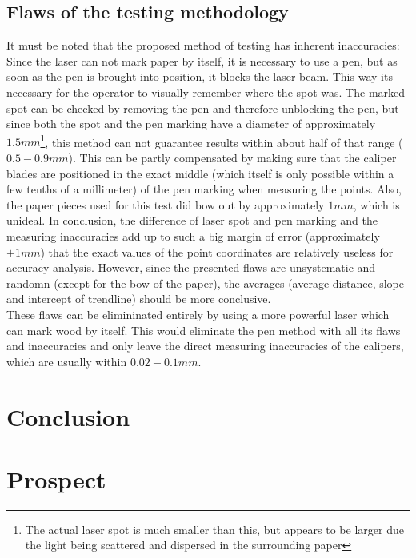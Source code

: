 \documentclass[a4paper, 11pt]{scrartcl}
\begin{document}
\subsection{Flaws of the testing methodology} It must be noted that the proposed method of testing has inherent inaccuracies: Since the laser can not mark paper by itself, it is necessary to use a pen, but as soon as the pen is brought into position, it blocks the laser beam. This way its necessary for the operator to visually remember where the spot was. The marked spot can be checked by removing the pen and therefore unblocking the pen, but since both the spot and the pen marking have a diameter of approximately $1.5mm$\footnote{The actual laser spot is much smaller than this, but appears to be larger due the light  being scattered and dispersed in the surrounding paper}, this method can not guarantee results within about half of that range ($0.5 - 0.9 mm$). This can be partly compensated by making sure that the caliper blades are positioned in the exact middle (which itself is only possible within a few tenths of a millimeter) of the pen marking when measuring the points. Also, the paper pieces used for this test did bow out by approximately $1mm$, which is unideal. In conclusion, the difference of laser spot and pen marking and the measuring inaccuracies add up to such a big margin of error (approximately $\pm 1mm$) that the exact values of the point coordinates are relatively useless for accuracy analysis. However, since the presented flaws are unsystematic and randomn (except for the bow of the paper), the averages (average distance, slope and intercept of trendline) should be more conclusive. \\
These flaws can be elimininated entirely by using a more powerful laser which can mark wood by itself. This would eliminate the pen method with all its flaws and inaccuracies and only leave the direct measuring inaccuracies of the calipers, which are usually within $0.02 - 0.1mm$. \\

\section{Conclusion}

\section{Prospect}


\end{document}

